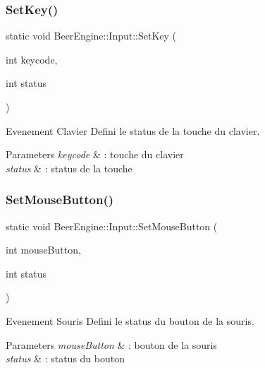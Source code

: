 \subsubsection{\texorpdfstring{Set\+Key()}{SetKey()}}
{\footnotesize\ttfamily static void Beer\+Engine\+::\+Input\+::\+Set\+Key (\begin{DoxyParamCaption}\item[{int}]{keycode,  }\item[{int}]{status }\end{DoxyParamCaption})\hspace{0.3cm}{\ttfamily [static]}}



Evenement Clavier Defini le status de la touche du clavier. 


\begin{DoxyParams}{Parameters}
{\em keycode} & \+: touche du clavier \\
\hline
{\em status} & \+: status de la touche \\
\hline
\end{DoxyParams}
\mbox{\label{class_beer_engine_1_1_input_a8761deb95726518ed5871a38aca6451d}} 
\subsubsection{\texorpdfstring{Set\+Mouse\+Button()}{SetMouseButton()}}
{\footnotesize\ttfamily static void Beer\+Engine\+::\+Input\+::\+Set\+Mouse\+Button (\begin{DoxyParamCaption}\item[{int}]{mouse\+Button,  }\item[{int}]{status }\end{DoxyParamCaption})\hspace{0.3cm}{\ttfamily [static]}}



Evenement Souris Defini le status du bouton de la souris. 


\begin{DoxyParams}{Parameters}
{\em mouse\+Button} & \+: bouton de la souris \\
\hline
{\em status} & \+: status du bouton \\
\hline
\end{DoxyParams}
\mbox{\label{class_beer_engine_1_1_input_a8a5a3a1a4b5fdedf20fc66c40d8e98bb}} 
